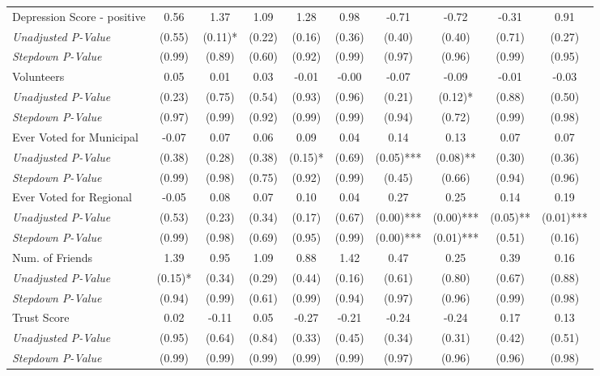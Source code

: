 \begin{tabular}{l c c c c c c c c c}
Depression Score - positive & 0.56 & 1.37 & 1.09 & 1.28 & 0.98 & -0.71 & -0.72 & -0.31 & 0.91 \\
\quad \textit{Unadjusted P-Value} & (0.55) & (0.11)* & (0.22) & (0.16) & (0.36) & (0.40) & (0.40) & (0.71) & (0.27) \\
\quad \textit{Stepdown P-Value} & (0.99) & (0.89) & (0.60) & (0.92) & (0.99) & (0.97) & (0.96) & (0.99) & (0.95) \\
Volunteers & 0.05 & 0.01 & 0.03 & -0.01 & -0.00 & -0.07 & -0.09 & -0.01 & -0.03 \\
\quad \textit{Unadjusted P-Value} & (0.23) & (0.75) & (0.54) & (0.93) & (0.96) & (0.21) & (0.12)* & (0.88) & (0.50) \\
\quad \textit{Stepdown P-Value} & (0.97) & (0.99) & (0.92) & (0.99) & (0.99) & (0.94) & (0.72) & (0.99) & (0.98) \\
Ever Voted for Municipal & -0.07 & 0.07 & 0.06 & 0.09 & 0.04 & 0.14 & 0.13 & 0.07 & 0.07 \\
\quad \textit{Unadjusted P-Value} & (0.38) & (0.28) & (0.38) & (0.15)* & (0.69) & (0.05)*** & (0.08)** & (0.30) & (0.36) \\
\quad \textit{Stepdown P-Value} & (0.99) & (0.98) & (0.75) & (0.92) & (0.99) & (0.45) & (0.66) & (0.94) & (0.96) \\
Ever Voted for Regional & -0.05 & 0.08 & 0.07 & 0.10 & 0.04 & 0.27 & 0.25 & 0.14 & 0.19 \\
\quad \textit{Unadjusted P-Value} & (0.53) & (0.23) & (0.34) & (0.17) & (0.67) & (0.00)*** & (0.00)*** & (0.05)** & (0.01)*** \\
\quad \textit{Stepdown P-Value} & (0.99) & (0.98) & (0.69) & (0.95) & (0.99) & (0.00)*** & (0.01)*** & (0.51) & (0.16) \\
Num. of Friends & 1.39 & 0.95 & 1.09 & 0.88 & 1.42 & 0.47 & 0.25 & 0.39 & 0.16 \\
\quad \textit{Unadjusted P-Value} & (0.15)* & (0.34) & (0.29) & (0.44) & (0.16) & (0.61) & (0.80) & (0.67) & (0.88) \\
\quad \textit{Stepdown P-Value} & (0.94) & (0.99) & (0.61) & (0.99) & (0.94) & (0.97) & (0.96) & (0.99) & (0.98) \\
Trust Score & 0.02 & -0.11 & 0.05 & -0.27 & -0.21 & -0.24 & -0.24 & 0.17 & 0.13 \\
\quad \textit{Unadjusted P-Value} & (0.95) & (0.64) & (0.84) & (0.33) & (0.45) & (0.34) & (0.31) & (0.42) & (0.51) \\
\quad \textit{Stepdown P-Value} & (0.99) & (0.99) & (0.99) & (0.99) & (0.99) & (0.97) & (0.96) & (0.96) & (0.98) \\
\bottomrule
\end{tabular}
